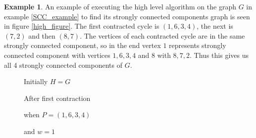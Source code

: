\documentclass{report}
\theoremstyle{plain}
\theoremstyle{definition}
\newtheorem{example}{Example}
\theoremstyle{remark}
\numberwithin{definition}{chapter}
\numberwithin{example}{chapter}
\numberwithin{figure}{chapter}
\numberwithin{theorem}{chapter}
\numberwithin{lemma}{chapter}
\begin{document}
\begin{example}

An example of executing the high level algorithm on the graph $G$ in example \ref{SCC_example} to find its strongly connected components graph is seen in figure \ref{high_figure}. The first contracted cycle is $(1,6,3,4)$, the next is $(7,2)$ and then $(8,7)$. The vertices of each contracted cycle are in the same strongly connected component, so in the end vertex $1$ represents strongly connected component with vertices $1,6,3,4$ and $8$ with $8,7,2$. Thus this gives us all 4 strongly connected components of $G$.

\begin{figure}[h]
\center

\begin{minipage}[h]{0.24\textwidth}

Initially $H=G$
\end{minipage}
\hfill
{}

After first contraction

when $P=(1,6,3,4)$

and $w=1$
\endminipage\hfill
{}


\end{figure}
\end{example}
\end{document}
